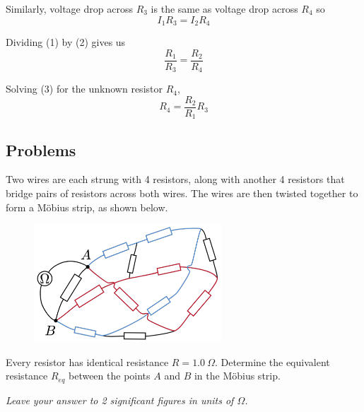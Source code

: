 Similarly, voltage drop across $R_3$ is the same as voltage drop across $R_4$ so
\begin{equation*}\tag{2}
I_1 R_3 = I_2 R_4
\end{equation*}

Dividing (1) by (2) gives us
\begin{equation*}\tag{3}
\frac{R_1}{R_3} = \frac{R_2}{R_4}
\end{equation*}

Solving (3) for the unknown resistor $R_4$,
\[ R_4 = \frac{R_2}{R_1}R_3 \]
\pagebreak

\subsection*{Problems}
\begin{prbm}
Two wires are each strung with 4 resistors, along with another 4 resistors that bridge pairs of resistors across both wires. The wires are then twisted together to form a M\"{o}bius strip, as shown below.

\begin{figure}[H]
    \centering
    \includegraphics[width=7cm]{images/Mobius_strip.png}
\end{figure}

Every resistor has identical resistance $R = 1.0\:\Omega$. Determine the equivalent resistance $R_{eq}$ between the points $A$ and $B$ in the M\"{o}bius strip.

\textit{Leave your answer to 2 significant figures in units of $\Omega$.}
\end{prbm}

